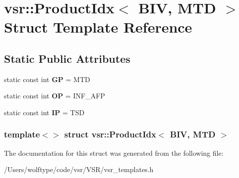 \hypertarget{structvsr_1_1_product_idx_3_01_b_i_v_00_01_m_t_d_01_4}{\section{vsr\-:\-:Product\-Idx$<$ B\-I\-V, M\-T\-D $>$ Struct Template Reference}
\label{structvsr_1_1_product_idx_3_01_b_i_v_00_01_m_t_d_01_4}
}
\subsection*{Static Public Attributes}
\begin{DoxyCompactItemize}
\item 
\hypertarget{structvsr_1_1_product_idx_3_01_b_i_v_00_01_m_t_d_01_4_acaa451826874eb71ceb802d14482d84c}{static const int {\bfseries G\-P} = M\-T\-D}\label{structvsr_1_1_product_idx_3_01_b_i_v_00_01_m_t_d_01_4_acaa451826874eb71ceb802d14482d84c}

\item 
\hypertarget{structvsr_1_1_product_idx_3_01_b_i_v_00_01_m_t_d_01_4_a32eaaa9305704ea2dd1be90c17ab2ad3}{static const int {\bfseries O\-P} = I\-N\-F\-\_\-\-A\-F\-P}\label{structvsr_1_1_product_idx_3_01_b_i_v_00_01_m_t_d_01_4_a32eaaa9305704ea2dd1be90c17ab2ad3}

\item 
\hypertarget{structvsr_1_1_product_idx_3_01_b_i_v_00_01_m_t_d_01_4_a76c104e554dbce0289ef23ed8decd435}{static const int {\bfseries I\-P} = T\-S\-D}\label{structvsr_1_1_product_idx_3_01_b_i_v_00_01_m_t_d_01_4_a76c104e554dbce0289ef23ed8decd435}

\end{DoxyCompactItemize}
\subsubsection*{template$<$$>$ struct vsr\-::\-Product\-Idx$<$ B\-I\-V, M\-T\-D $>$}



The documentation for this struct was generated from the following file\-:\begin{DoxyCompactItemize}
\item 
/\-Users/wolftype/code/vsr/\-V\-S\-R/vsr\-\_\-templates.\-h\end{DoxyCompactItemize}
